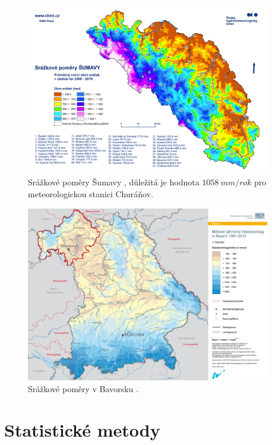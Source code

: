 \begin{figure}
	\centering
	\includegraphics[width=0.95\textwidth]{img/ch1/srazkovepomerysumava.png}
	\caption{Srážkové poměry Šumavy \parencite{srazkovepomerysumava}, důležitá je hodnota $\SI{1058}{mm/rok}$ pro meteorologickou stanici Churáňov.}
	\label{fig:srazkovepomerysumava}
\end{figure}

\begin{figure}
	\centering
	\includegraphics[width=0.95\textwidth]{img/ch1/srazkovepomerybavorskyles.png}
	\caption{Srážkové poměry v Bavorsku \parencite{srazkovepomerybavorskyles}.}
	\label{fig:srazkovepomerybavorskyles}
\end{figure}

\clearpage

\section{Statistické metody}\label{chap:statistika}

